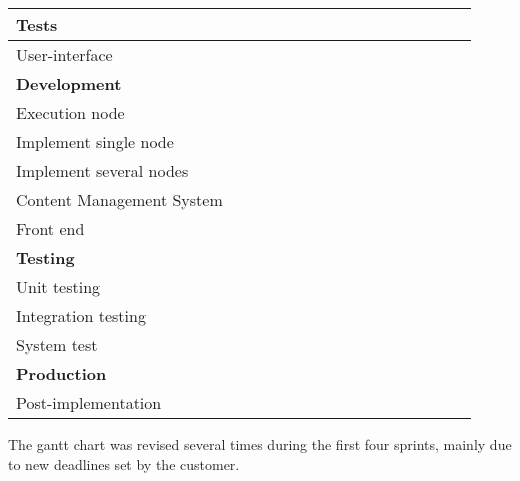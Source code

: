\begin{longtable}{|l|l|l|l|l|l|l|l|l|l|l|l|l|l|l|l|}
\hline
Tests &&&\cellcolor{RoyalBlue}&\cellcolor{RoyalBlue}&\cellcolor{RoyalBlue}&\cellcolor{RoyalBlue}&&&&&&&&&  \\
\hline
User-interface&&&&&\cellcolor{MidnightBlue}&\cellcolor{MidnightBlue}&\cellcolor{MidnightBlue}&\cellcolor{MidnightBlue}&\cellcolor{MidnightBlue}&&&&&&  \\
\hline
\textbf{Development}&&&&\cellcolor{Purple}&\cellcolor{Purple}&\cellcolor{Purple}&\cellcolor{Purple}&\cellcolor{Purple}&\cellcolor{Purple}&\cellcolor{Purple}&\cellcolor{Purple}&&&&  \\
\hline
Execution node&&&&&&&&\cellcolor{Orchid}&\cellcolor{Orchid}&\cellcolor{Orchid}&\cellcolor{Orchid}&&&&  \\
\hline
Implement single node&&&&&&&&\cellcolor{Thistle}&\cellcolor{Thistle}&\cellcolor{Thistle}&&&&&  \\
\hline
Implement several nodes&&&&&&&&&\cellcolor{Thistle}&\cellcolor{Thistle}&&&&&  \\
\hline
Content Management System&&&&&&&&&&&\cellcolor{Orchid}&&&&  \\
\hline
Front end&&&&\cellcolor{Orchid}&\cellcolor{Orchid}&\cellcolor{Orchid}&\cellcolor{Orchid}&\cellcolor{Orchid}&\cellcolor{Orchid}&\cellcolor{Orchid}&\cellcolor{Orchid}&&&&  \\
\hline
\textbf{Testing}&&&&&&&\cellcolor{Red}&\cellcolor{Red}&\cellcolor{Red}&\cellcolor{Red}&\cellcolor{Red}&\cellcolor{Red}&\cellcolor{Red}&\cellcolor{Red}&\cellcolor{Red}  \\
\hline
Unit testing &&&&&&&\cellcolor{Orchid}&\cellcolor{Orchid}&\cellcolor{Orchid}&\cellcolor{Orchid}&\cellcolor{Orchid}&\cellcolor{Orchid}&\cellcolor{Orchid}&\cellcolor{Orchid}&\cellcolor{Orchid}  \\
\hline
Integration testing&&&&&&&&&\cellcolor{Melon}&\cellcolor{Melon}&\cellcolor{Melon}&\cellcolor{Melon}&\cellcolor{Melon}&\cellcolor{Melon}&\cellcolor{Melon}  \\
\hline
System test&&&&&&&&&\cellcolor{Melon}&\cellcolor{Melon}&\cellcolor{Melon}&\cellcolor{Melon}&\cellcolor{Melon}&\cellcolor{Melon}&\cellcolor{Melon}  \\
\hline
\textbf{Production}&&&&&&&&&&&&&&\cellcolor{MidnightBlue}&\cellcolor{MidnightBlue}  \\
\hline
Post-implementation&&&&&&&&&&&&&&&\cellcolor{Plum} \\
\hline
\end{longtable}

The gantt chart was revised several times during the first four sprints,
mainly due to new deadlines set by the customer. 

